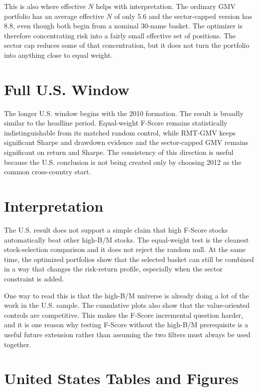 \documentclass[11pt,a4paper]{report}
\numberwithin{figure}{chapter}
\numberwithin{table}{chapter}
\numberwithin{equation}{chapter}
\begin{document}
This is also where effective $N$ helps with interpretation. The ordinary GMV portfolio has an average effective $N$ of only 5.6 and the sector-capped version has 8.8, even though both begin from a nominal 30-name basket. The optimizer is therefore concentrating risk into a fairly small effective set of positions. The sector cap reduces some of that concentration, but it does not turn the portfolio into anything close to equal weight.

\section{Full U.S. Window}

The longer U.S. window begins with the 2010 formation. The result is broadly similar to the headline period. Equal-weight F-Score remains statistically indistinguishable from its matched random control, while RMT-GMV keeps significant Sharpe and drawdown evidence and the sector-capped GMV remains significant on return and Sharpe. The consistency of this direction is useful because the U.S. conclusion is not being created only by choosing 2012 as the common cross-country start.

\section{Interpretation}

The U.S. result does not support a simple claim that high F-Score stocks automatically beat other high-B/M stocks. The equal-weight test is the cleanest stock-selection comparison and it does not reject the random null. At the same time, the optimized portfolios show that the selected basket can still be combined in a way that changes the risk-return profile, especially when the sector constraint is added.

One way to read this is that the high-B/M universe is already doing a lot of the work in the U.S. sample. The cumulative plots also show that the value-oriented controls are competitive. This makes the F-Score incremental question harder, and it is one reason why testing F-Score without the high-B/M prerequisite is a useful future extension rather than assuming the two filters must always be used together.

\section{United States Tables and Figures}
\label{sec:us_exhibits}
\end{document}
